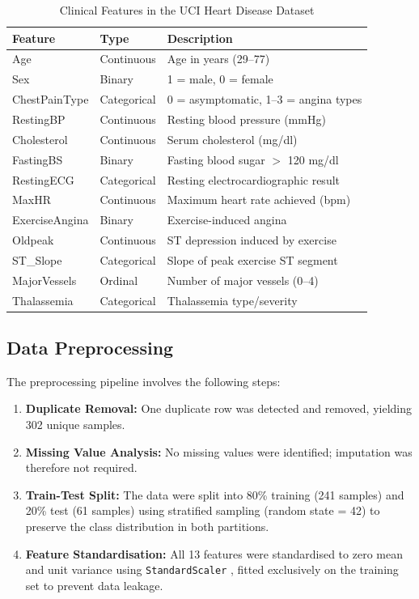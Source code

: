 \documentclass[conference]{IEEEtran}
\begin{document}
\begin{table}[H]
\centering
\caption{Clinical Features in the UCI Heart Disease Dataset}
\label{tab:features}
\begin{tabular}{lll}
\toprule
\textbf{Feature} & \textbf{Type} & \textbf{Description} \\
\midrule
Age              & Continuous & Age in years (29–77) \\
Sex              & Binary     & 1 = male, 0 = female \\
ChestPainType    & Categorical & 0 = asymptomatic, 1–3 = angina types \\
RestingBP        & Continuous & Resting blood pressure (mmHg) \\
Cholesterol      & Continuous & Serum cholesterol (mg/dl) \\
FastingBS        & Binary     & Fasting blood sugar $>$ 120 mg/dl \\
RestingECG       & Categorical & Resting electrocardiographic result \\
MaxHR            & Continuous & Maximum heart rate achieved (bpm) \\
ExerciseAngina   & Binary     & Exercise-induced angina \\
Oldpeak          & Continuous & ST depression induced by exercise \\
ST\_Slope        & Categorical & Slope of peak exercise ST segment \\
MajorVessels     & Ordinal    & Number of major vessels (0–4) \\
Thalassemia      & Categorical & Thalassemia type/severity \\
\bottomrule
\end{tabular}
\end{table}

\subsection{Data Preprocessing}

The preprocessing pipeline involves the following steps:

\begin{enumerate}
    \item \textbf{Duplicate Removal:} One duplicate row was detected and removed, yielding 302 unique samples.
    \item \textbf{Missing Value Analysis:} No missing values were identified; imputation was therefore not required.
    \item \textbf{Train-Test Split:} The data were split into 80\% training (241 samples) and 20\% test (61 samples) using stratified sampling (random state = 42) to preserve the class distribution in both partitions.
    \item \textbf{Feature Standardisation:} All 13 features were standardised to zero mean and unit variance using \texttt{StandardScaler} \cite{scikit-learn}, fitted exclusively on the training set to prevent data leakage.
\end{enumerate}
\end{document}
